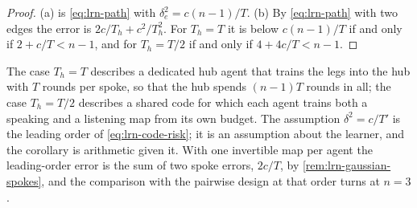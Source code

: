 \begin{proof}
(a) is \cref{eq:lrn-path} with $\delta_e^2=c(n-1)/T$. (b) By \cref{eq:lrn-path} with two edges the error is $2c/T_h+c^2/T_h^2$. For $T_h=T$ it is below $c(n-1)/T$ if and only if $2+c/T<n-1$, and for $T_h=T/2$ if and only if $4+4c/T<n-1$.
\end{proof}

The case $T_h=T$ describes a dedicated hub agent that trains the legs into the hub with $T$ rounds per spoke, so that the hub spends $(n-1)T$ rounds in all; the case $T_h=T/2$ describes a shared code for which each agent trains both a speaking and a listening map from its own budget. The assumption $\delta^2=c/T'$ is the leading order of \cref{eq:lrn-code-risk}; it is an assumption about the learner, and the corollary is arithmetic given it. With one invertible map per agent the leading-order error is the sum of two spoke errors, $2c/T$, by \cref{rem:lrn-gaussian-spokes}, and the comparison with the pairwise design at that order turns at $n=3$.
